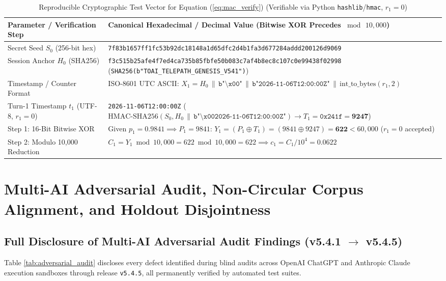 \documentclass[9pt,a4paper]{extarticle}
\begin{document}
\begin{table}[h!]
\centering
\caption{Reproducible Cryptographic Test Vector for Equation (\ref{eq:mac_verify}) (Verifiable via Python \texttt{hashlib}/\texttt{hmac}, $r_1 = 0$)}
\label{tab:crypto_vector}
\footnotesize
\renewcommand{\arraystretch}{0.98}
\setlength{\tabcolsep}{2.5pt}
\begin{tabularx}{\textwidth}{L{3.7cm} Y}
\toprule
{}
\textbf{\color{white}Parameter / Verification Step} &
\textbf{\color{white}Canonical Hexadecimal / Decimal Value (Bitwise XOR Precedes $\bmod\, 10{,}000$)} \\
\midrule
Secret Seed $S_0$ (256-bit hex) & \texttt{7f83b1657ff1fc53b92dc18148a1d65dfc2d4b1fa3d677284addd200126d9069} \\
Session Anchor $H_0$ (SHA256) & \texttt{f3c515b25afe4f7ed4ca735b85fbfe50b083c7af4b8ec8c107c0e99438f02998} (\texttt{SHA256(b"TOAI\_TELEPATH\_GENESIS\_V541")}) \\
Timestamp / Counter Format & ISO-8601 UTC ASCII: $X_1 = H_0 \,\|\, \texttt{b"\textbackslash x00"} \,\|\, \texttt{b"2026-11-06T12:00:00Z"} \,\|\, \text{int\_to\_bytes}(r_1, 2)$ \\
Turn-1 Timestamp $t_1$ (UTF-8, $r_1=0$) & \texttt{2026-11-06T12:00:00Z} ($\text{HMAC-SHA256}(S_0, H_0 \,\|\, \texttt{b"\textbackslash x002026-11-06T12:00:00Z"}) \rightarrow T_1 = \texttt{0x241f} = \mathbf{9247}$) \\
Step 1: 16-Bit Bitwise XOR & Given $p_1 = 0.9841 \implies P_1 = 9841$: $Y_1 = (P_1 \oplus T_1) = (9841 \oplus 9247) = \mathbf{622} < 60{,}000$ ($r_1 = 0$ accepted) \\
Step 2: Modulo 10,000 Reduction & $C_1 = Y_1 \bmod 10{,}000 = 622 \bmod 10{,}000 = 622 \implies c_1 = C_1 / 10^4 = \mathbf{0.0622}$ \\
\bottomrule
\end{tabularx}
\end{table}

\section{Multi-AI Adversarial Audit, Non-Circular Corpus Alignment, and Holdout Disjointness}
\subsection{Full Disclosure of Multi-AI Adversarial Audit Findings (v5.4.1 $\rightarrow$ v5.4.5)}
Table \ref{tab:adversarial_audit} discloses every defect identified during blind audits across OpenAI ChatGPT and Anthropic Claude execution sandboxes through release \texttt{v5.4.5}, all permanently verified by automated test suites.
\end{document}
